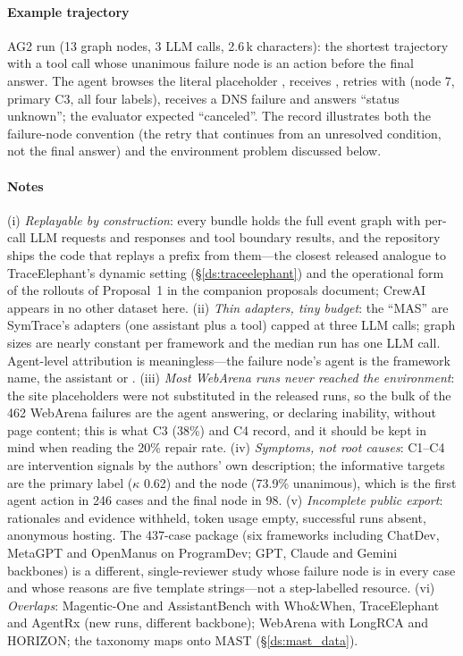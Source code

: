 \paragraph{Example trajectory} AG2 run  (13 graph nodes, 3 LLM calls, 2.6\,k characters): the shortest trajectory with a tool call whose unanimous failure node is an action before the final answer. The agent browses the literal placeholder , receives , retries with  (node 7, primary C3, all four labels), receives a DNS failure and answers ``status unknown''; the evaluator expected ``canceled''. The record illustrates both the failure-node convention (the retry that continues from an unresolved condition, not the final answer) and the environment problem discussed below.


\paragraph{Notes} (i) \emph{Replayable by construction}: every bundle holds the full event graph with per-call LLM requests and responses and tool boundary results, and the repository ships the code that replays a prefix from them---the closest released analogue to TraceElephant's dynamic setting (\S\ref{ds:traceelephant}) and the operational form of the rollouts of Proposal~1 in the companion proposals document; CrewAI appears in no other dataset here. (ii) \emph{Thin adapters, tiny budget}: the ``MAS'' are SymTrace's  adapters (one assistant plus a  tool) capped at three LLM calls; graph sizes are nearly constant per framework and the median run has one LLM call. Agent-level attribution is meaningless---the failure node's agent is the framework name, the assistant or . (iii) \emph{Most WebArena runs never reached the environment}: the site placeholders were not substituted in the released runs, so the bulk of the 462 WebArena failures are the agent answering, or declaring inability, without page content; this is what C3 (38\%) and C4 record, and it should be kept in mind when reading the 20\% repair rate. (iv) \emph{Symptoms, not root causes}: C1--C4 are intervention signals by the authors' own description; the informative targets are the primary label ($\kappa$ 0.62) and the node (73.9\% unanimous), which is the first agent action in 246 cases and the final node in 98. (v) \emph{Incomplete public export}: rationales and evidence withheld, token usage empty, successful runs absent, anonymous hosting. The 437-case package (six frameworks including ChatDev, MetaGPT and OpenManus on ProgramDev; GPT, Claude and Gemini backbones) is a different, single-reviewer study whose failure node is  in every case and whose reasons are five template strings---not a step-labelled resource. (vi) \emph{Overlaps}: Magentic-One and AssistantBench with Who\&When, TraceElephant and AgentRx (new runs, different backbone); WebArena with LongRCA and HORIZON; the taxonomy maps onto MAST (\S\ref{ds:mast_data}).
